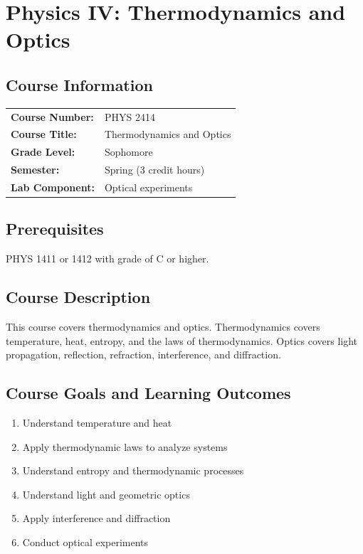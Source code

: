 \documentclass[12pt,oneside]{book}
\begin{document}

\chapter{Physics IV: Thermodynamics and Optics}

\section{Course Information}

\begin{tabular}{ll}
\textbf{Course Number:} & PHYS 2414 \\
\textbf{Course Title:} & Thermodynamics and Optics \\
\textbf{Grade Level:} & Sophomore \\
\textbf{Semester:} & Spring (3 credit hours) \\
\textbf{Lab Component:} & Optical experiments \\
\end{tabular}

\section{Prerequisites}

PHYS 1411 or 1412 with grade of C or higher.

\section{Course Description}

This course covers thermodynamics and optics. Thermodynamics covers temperature, heat, entropy, and the laws of thermodynamics. Optics covers light propagation, reflection, refraction, interference, and diffraction.

\section{Course Goals and Learning Outcomes}

\begin{enumerate}
    \item Understand temperature and heat
    \item Apply thermodynamic laws to analyze systems
    \item Understand entropy and thermodynamic processes
    \item Understand light and geometric optics
    \item Apply interference and diffraction
    \item Conduct optical experiments
\end{enumerate}
\end{document}
